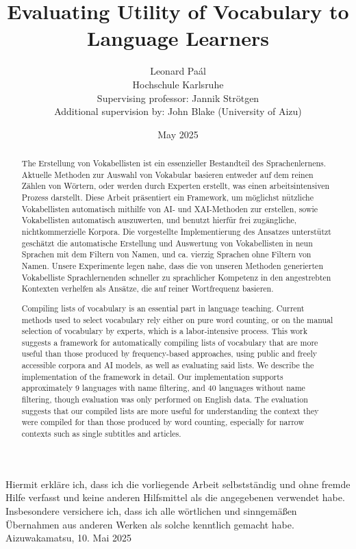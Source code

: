 \documentclass[12pt]{report}
\title{Evaluating Utility of Vocabulary to Language Learners}
\author{Leonard Paál\\Hochschule Karlsruhe\\Supervising professor: Jannik Strötgen\\Additional supervision by: John Blake (University of Aizu)}
\date{May 2025}
\begin{document}
\maketitle

Hiermit erkläre ich, dass ich die vorliegende Arbeit selbstständig und ohne fremde Hilfe verfasst und keine anderen Hilfsmittel als die angegebenen verwendet habe.
Insbesondere versichere ich, dass ich alle wörtlichen und sinngemäßen Übernahmen aus anderen Werken als solche kenntlich gemacht habe.
\\

Aizuwakamatsu, 10. Mai 2025

\begin{abstract}
	The Erstellung von Vokabellisten ist ein essenzieller Bestandteil des Sprachenlernens.
	Aktuelle Methoden zur Auswahl von Vokabular basieren entweder auf dem reinen Zählen von Wörtern, oder werden durch Experten erstellt, was einen arbeitsintensiven Prozess darstellt.
	Diese Arbeit präsentiert ein Framework, um möglichst nützliche Vokabellisten automatisch mithilfe von AI- und XAI-Methoden zur erstellen, sowie Vokabellisten automatisch auszuwerten, und benutzt hierfür frei zugängliche, nichtkommerzielle Korpora.
	Die vorgestellte Implementierung des Ansatzes unterstützt geschätzt die automatische Erstellung und Auswertung von Vokabellisten in neun Sprachen mit dem Filtern von Namen, und ca. vierzig Sprachen ohne Filtern von Namen.
	Unsere Experimente legen nahe, dass die von unseren Methoden generierten Vokabelliste Sprachlernenden schneller zu sprachlicher Kompetenz in den angestrebten Kontexten verhelfen als Ansätze, die auf reiner Wortfrequenz basieren.
\end{abstract}

\begin{abstract}
	Compiling lists of vocabulary is an essential part in language teaching.
	Current methods used to select vocabulary rely either on pure word counting, or on the manual selection of vocabulary by experts, which is a labor-intensive process.
	This work suggests a framework for automatically compiling lists of vocabulary that are more useful than those produced by frequency-based approaches, using public and freely accessible corpora and AI models, as well as evaluating said lists.
	We describe the implementation of the framework in detail.
	Our implementation supports approximately 9 languages with name filtering, and 40 languages without name filtering, though evaluation was only performed on English data.
	The evaluation suggests that our compiled lists are more useful for understanding the context they were compiled for than those produced by word counting, especially for narrow contexts such as single subtitles and articles.
\end{abstract}
\end{document}
